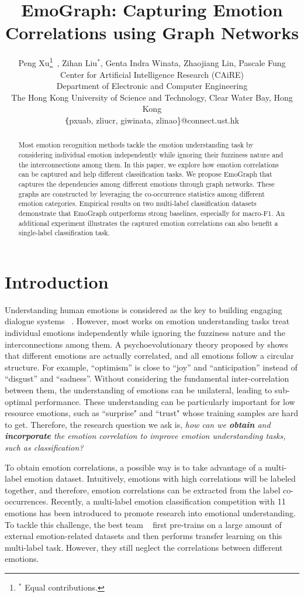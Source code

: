 \documentclass[11pt,a4paper]{article}
\title{EmoGraph: Capturing Emotion Correlations using Graph Networks}
\author{Peng Xu\thanks{$^*$ Equal contributions.}~, Zihan Liu$^*$, Genta Indra Winata, Zhaojiang Lin, Pascale Fung \\
Center for Artificial Intelligence Research (CAiRE)\\
Department of Electronic and Computer Engineering\\
The Hong Kong University of Science and Technology, Clear Water Bay, Hong Kong\\
\texttt\{pxuab, zliucr, giwinata, zlinao\}@connect.ust.hk}
\date{}
\begin{document}
\maketitle
\begin{abstract}
Most emotion recognition methods tackle the emotion understanding task by considering individual emotion independently while ignoring their fuzziness nature and the interconnections among them. In this paper, we explore how emotion correlations can be captured and help different classification tasks. We propose EmoGraph that captures the dependencies among different emotions through graph networks. These graphs are constructed by leveraging the co-occurrence statistics among different emotion categories. Empirical results on two multi-label classification datasets demonstrate that EmoGraph outperforms strong baselines, especially for macro-F1. An additional experiment illustrates the captured emotion correlations can also benefit a single-label classification task.
\end{abstract}

\section{Introduction}



Understanding human emotions is considered as the key to building engaging dialogue systems ~\cite{zhou2018design}. However, most works on emotion understanding tasks treat individual emotions independently while ignoring the fuzziness nature and the interconnections among them. A psychoevolutionary theory proposed by \citet{plutchik1984emotions} shows that different emotions are actually correlated, and all emotions follow a circular structure. For example, ``optimism'' is close to ``joy'' and ``anticipation'' instead of ``disgust'' and ``sadness''. Without considering the fundamental inter-correlation between them, the understanding of emotions can be unilateral, leading to sub-optimal performance. These understanding can be particularly important for low resource emotions, such as ``surprise" and ``trust" whose training samples are hard to get. 
Therefore, the research question we ask is, \textit{how can we \textbf{obtain} and \textbf{incorporate} the emotion correlation to improve emotion understanding tasks, such as classification?}

To obtain emotion correlations, a possible way is to take advantage of a multi-label emotion dataset. Intuitively, emotions with high correlations will be labeled together, and therefore, emotion correlations can be extracted from the label co-occurrences. Recently, a multi-label emotion classification competition \cite{mohammad2018semeval} with 11 emotions has been introduced to promote research into emotional understanding. To tackle this challenge, the best team ~\cite{baziotis2018ntua} first pre-trains on a large amount of external emotion-related datasets and then performs transfer learning on this multi-label task. However, they still neglect the correlations between different emotions.
\end{document}
